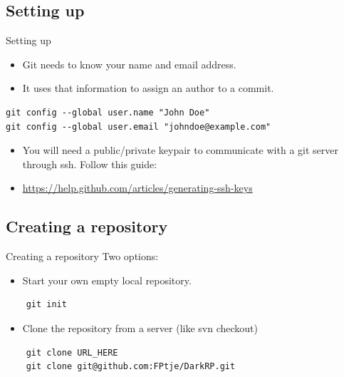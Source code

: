 \documentclass[10pt,a4paper]{beamer}
\begin{document}
\subsection{Setting up}
\begin{frame}[fragile]{Setting up}
\begin{itemize}
\item Git needs to know your name and email address.
\item It uses that information to assign an author to a commit.
\end{itemize}

\begin{verbatim}
git config --global user.name "John Doe"
git config --global user.email "johndoe@example.com"
\end{verbatim}

\begin{itemize}
\item You will need a public/private keypair to communicate with a git server through ssh. Follow this guide:
\item \href{https://help.github.com/articles/generating-ssh-keys}{\color{blue}https://help.github.com/articles/generating-ssh-keys}
\end{itemize}
\end{frame}

\subsection{Creating a repository}
\begin{frame}[fragile]{Creating a repository}
Two options:

\begin{itemize}
\item Start your own empty local repository.
\end{itemize}

	\begin{verbatim}
	git init
	\end{verbatim}

\begin{itemize}
\item Clone the repository from a server (like svn checkout)
\end{itemize}

	\begin{verbatim}
	git clone URL_HERE
	git clone git@github.com:FPtje/DarkRP.git
	\end{verbatim}
\end{frame}
\end{document}
